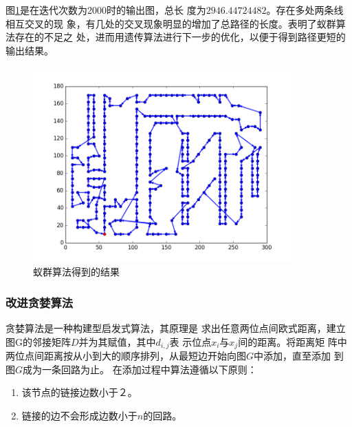 \documentclass[fontset=windows,a4paper,12pt]{ctexart}
\begin{document}
		   图\ref{fig:anti}是在迭代次数为2000时的输出图，总长
		   度为$2946.44724482$。存在多处两条线相互交叉的现
		   象，有几处的交叉现象明显的增加了总路径的长度。表明了蚁群算法存在的不足之
		   处，进而用遗传算法进行下一步的优化，以便于得到路径更短的输出结果。			
    	   \begin{figure}[htbp]
    	   	 \centering
    	   	 \includegraphics[width=10cm]{pic/anti_result.png}
    	   	 \caption{蚁群算法得到的结果}
    	   	 \label{fig:anti}
    	   \end{figure}


      \subsubsection{改进贪婪算法\cite{饶卫振2012基于求解}}
        贪婪算法是一种构建型启发式算法，其原理是
        求出任意两位点间欧式距离，建立图G的邻接矩阵$D$并为其赋值，其中$d_{i,j}$表
        示位点$x_i$与$x_j$间的距离。将距离矩
        阵中两位点间距离按从小到大的顺序排列，从最短边开始向图$G$中添加，直至添加
        到图$G$成为一条回路为止。
        在添加过程中算法遵循以下原则：
        \begin{enumerate}
        	\item 该节点的链接边数小于２。
        	\item 链接的边不会形成边数小于$n$的回路。
        \end{enumerate}
        
\end{document}
